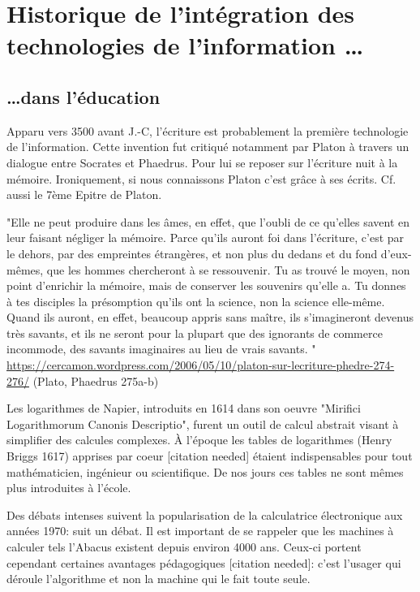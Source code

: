 
\chapter{Historique de l'intégration des technologies de l'information \ldots}\label{quoi}

\section{\ldots dans l'éducation}

Apparu vers 3500 avant J.-C, l'écriture est probablement la première 
technologie de l'information. Cette invention fut critiqué notamment par Platon
à travers un dialogue entre Socrates et Phaedrus. Pour lui se reposer sur 
l'écriture nuit à la mémoire. Ironiquement, si nous connaissons Platon c'est grâce
à ses écrits. Cf. aussi le 7ème Epitre de Platon.

"Elle ne peut produire dans les âmes, en effet, que l’oubli de ce qu’elles 
savent en leur faisant négliger la mémoire. Parce qu’ils auront foi dans 
l’écriture, c’est par le dehors, par des empreintes étrangères, et non plus du 
dedans et du fond d’eux-mêmes, que les hommes chercheront à se ressouvenir. Tu 
as trouvé le moyen, non point d’enrichir la mémoire, mais de conserver les 
souvenirs qu’elle a. Tu donnes à tes disciples la présomption qu’ils ont la 
science, non la science elle-même. Quand ils auront, en effet, beaucoup appris 
sans maître, ils s’imagineront devenus très savants, et ils ne seront pour la 
plupart que des ignorants de commerce incommode, des savants imaginaires au lieu
 de vrais savants. "
\url{https://cercamon.wordpress.com/2006/05/10/platon-sur-lecriture-phedre-274-276/}
(Plato, Phaedrus 275a-b)

Les logarithmes de Napier, introduits en 1614 dans son oeuvre
"Mirifici Logarithmorum Canonis Descriptio", furent un outil de calcul
abstrait visant à simplifier des calcules complexes. À l'époque les
tables de logarithmes (Henry Briggs 1617) apprises par coeur [citation
  needed] étaient indispensables pour tout mathématicien, ingénieur ou
scientifique. De nos jours ces tables ne sont mêmes plus introduites à
l'école.

Des débats intenses suivent la popularisation de la calculatrice électronique 
aux années 1970: suit un débat. Il est important de se rappeler que les 
machines à calculer tels l'Abacus existent depuis environ 4000 ans. Ceux-ci 
portent cependant certaines avantages pédagogiques [citation needed]: c'est 
l'usager qui déroule l'algorithme et non la machine qui le fait toute seule. 

